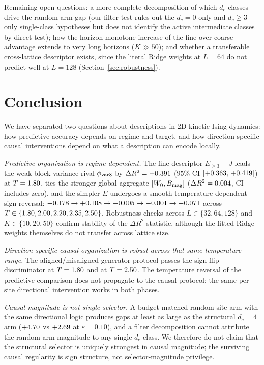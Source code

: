 \documentclass[aps,pre,preprint,superscriptaddress,showpacs]{revtex4-2}
\begin{document}
Remaining open questions: a more complete decomposition of which $d_c$
classes drive the random-arm gap (our filter test rules out the
$d_c=0$-only and $d_c\geq 3$-only single-class hypotheses but does not
identify the active intermediate classes by direct test);
how the horizon-monotone increase of the
fine-over-coarse advantage extends to very long horizons ($K\gg 50$);
and whether a transferable cross-lattice descriptor exists, since
the literal Ridge weights at $L=64$ do not predict well at $L=128$
(Section~\ref{sec:robustness}).

\section{Conclusion}
\label{sec:conclusion}

We have separated two questions about descriptions in 2D kinetic
Ising dynamics: how predictive accuracy depends on regime and target,
and how direction-specific causal interventions depend on what a
description can encode locally.

\emph{Predictive organization is regime-dependent.}
The fine descriptor $E_{\geq 3}+J$ leads the weak block-variance rival
$\phi_{\rm var8}$ by $\Delta R^2 = +0.391$
($95\%$ CI $[+0.363,\,+0.419]$) at $T=1.80$, ties
the stronger global aggregate $[W_0, B_{\rm mag}]$
($\Delta R^2 = 0.004$, CI includes zero), and the simpler $E$
undergoes a smooth temperature-dependent sign reversal:
$+0.178 \to +0.108 \to -0.005 \to
-0.001 \to -0.071$ across
$T \in \{1.80, 2.00, 2.20, 2.35, 2.50\}$.
Robustness checks across $L\in\{32,64,128\}$ and $K\in\{10,20,50\}$
confirm stability of the $\Delta R^2$ statistic, although the fitted
Ridge weights themselves do not transfer across lattice size.

\emph{Direction-specific causal organization is robust across that
same temperature range.}
The aligned/misaligned generator protocol passes the sign-flip
discriminator \AxisBSignFlips{} at $T=1.80$ and
\CausalDisSignFlips{} at $T=2.50$.
The temperature reversal of the predictive comparison does not
propagate to the causal protocol; the same per-site directional
intervention works in both phases.

\emph{Causal magnitude is not single-selector.}
A budget-matched random-site arm with the same directional logic
produces gaps at least as large as the structural $d_c=4$ arm
($+4.70$ vs $+2.69$ at $\varepsilon=0.10$), and a
filter decomposition cannot attribute the random-arm magnitude to any
single $d_c$ class.
We therefore do not claim that the structural selector is uniquely
strongest in causal magnitude; the surviving causal regularity is
sign structure, not selector-magnitude privilege.
\end{document}
